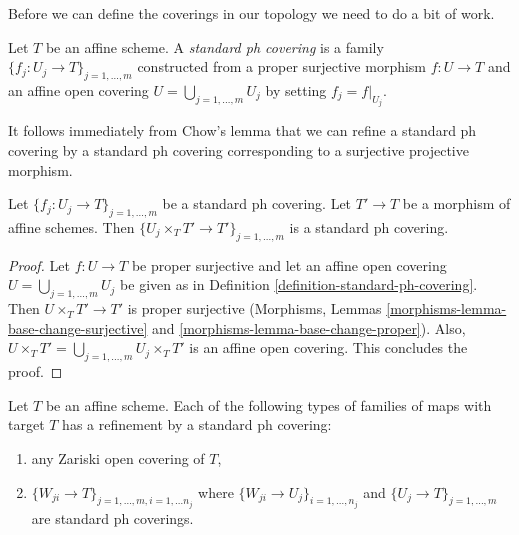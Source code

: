 \medskip\noindent
Before we can define the coverings in our topology we need to do
a bit of work.

\begin{definition}
\label{definition-standard-ph-covering}
Let $T$ be an affine scheme. A {\it standard ph covering} is a family
$\{f_j : U_j \to T\}_{j = 1, \ldots, m}$ constructed from a
proper surjective morphism $f : U \to T$ and an affine open covering
$U = \bigcup_{j = 1, \ldots, m} U_j$ by setting $f_j = f|_{U_j}$.
\end{definition}

\noindent
It follows immediately from Chow's lemma that we can refine a
standard ph covering by a standard ph covering corresponding to
a surjective projective morphism.

\begin{lemma}
\label{lemma-base-change-standard-ph}
Let $\{f_j : U_j \to T\}_{j = 1, \ldots, m}$ be a standard ph covering.
Let $T' \to T$ be a morphism of affine schemes.
Then $\{U_j \times_T T' \to T'\}_{j = 1, \ldots, m}$ is a
standard ph covering.
\end{lemma}

\begin{proof}
Let $f : U \to T$ be proper surjective and let an affine open covering
$U = \bigcup_{j = 1, \ldots, m} U_j$ be given as in
Definition \ref{definition-standard-ph-covering}.
Then $U \times_T T' \to T'$ is proper surjective
(Morphisms, Lemmas \ref{morphisms-lemma-base-change-surjective} and
\ref{morphisms-lemma-base-change-proper}).
Also, $U \times_T T' = \bigcup_{j = 1, \ldots, m} U_j \times_T T'$
is an affine open covering.
This concludes the proof.
\end{proof}

\begin{lemma}
\label{lemma-refine-by-standard-ph}
Let $T$ be an affine scheme. Each of the following types of families
of maps with target $T$ has a refinement by a standard ph covering:
\begin{enumerate}
\item any Zariski open covering of $T$,
\item $\{W_{ji} \to T\}_{j = 1, \ldots, m, i = 1, \ldots n_j}$
where $\{W_{ji} \to U_j\}_{i = 1, \ldots, n_j}$
and $\{U_j \to T\}_{j = 1, \ldots, m}$ are standard ph coverings.
\end{enumerate}
\end{lemma}

